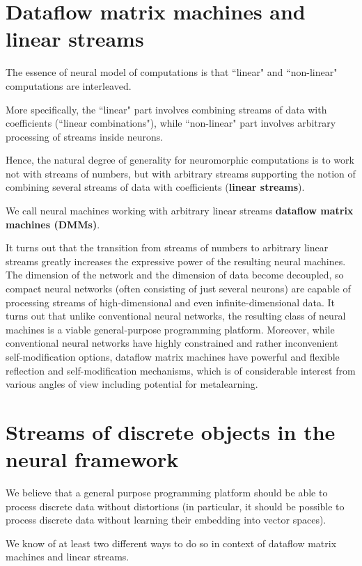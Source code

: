 \documentclass{article}
\begin{document}
\section{Dataflow matrix machines and linear streams}

The essence of neural model of computations is that ``linear" and ``non-linear" computations are interleaved. 

More specifically, the ``linear" part involves combining streams of data with coefficients (``linear combinations"),
while ``non-linear" part involves arbitrary processing of streams inside neurons.

 Hence, the natural
degree of generality for neuromorphic computations is to work not with streams of numbers, but with arbitrary streams
supporting the notion of combining several streams of data with coefficients ({\bf linear streams}).

We call neural machines working with arbitrary linear streams {\bf dataflow matrix machines (DMMs)}.

It turns out that the transition from streams of numbers to arbitrary linear streams greatly increases the
expressive power of the resulting neural machines.  The dimension of the network and the dimension
of data become decoupled, so compact neural networks (often consisting of just several neurons) are capable of
processing streams of high-dimensional and even infinite-dimensional data. It turns out that unlike
conventional neural networks, the resulting class of neural machines is a viable general-purpose programming
platform. Moreover, while conventional neural networks have highly constrained and rather inconvenient
self-modification options, dataflow matrix machines have powerful and flexible reflection and self-modification mechanisms,
which is of considerable interest from various angles of view including potential for metalearning.

\section{Streams of discrete objects in the neural framework}

We believe that a general purpose programming platform should be able to process discrete data without distortions (in particular, it should be
possible to process discrete data without learning their embedding into vector spaces).

We know of at least two different ways to do so in context of dataflow matrix machines and linear streams.
\end{document}
